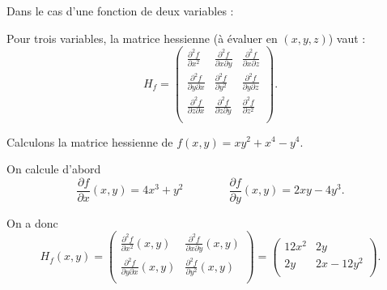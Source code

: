 Dans le cas d'une fonction de deux variables :

\bigskip

Pour trois variables, la matrice hessienne (à évaluer en $(x,y,z)$) vaut :
$$H_f=
\begin{pmatrix}
\frac{\partial^2f}{\partial x^2}&\frac{\partial^2f}{\partial x\partial y}&\frac{\partial^2f}{\partial x\partial z}\\  \frac{\partial^2f}{\partial y\partial x}&\frac{\partial^2f}{\partial y^2}&\frac{\partial^2f}{\partial y\partial z}\\  \frac{\partial^2f}{\partial z\partial x}&\frac{\partial^2f}{\partial z\partial y}&\frac{\partial^2f}{\partial z^2}\\
\end{pmatrix}.$$

\begin{exemple}{}{}
Calculons la matrice hessienne de $f(x,y) = xy^2 + x^4 - y^4$.

On calcule d'abord 
$$\frac{\partial f}{\partial x}(x,y) = 4x^3 + y^2
\qquad\qquad
\frac{\partial f}{\partial y}(x,y) = 2xy - 4y^3.$$

On a donc 
$$H_f(x,y)
= \begin{pmatrix}
    \frac{\partial ^2f}{\partial x^2}(x,y) & \frac{\partial ^2f}{\partial x\partial y}(x,y) \\
    \frac{\partial ^2f}{\partial y\partial x}(x,y) & \frac{\partial ^2f}{\partial y^2}(x,y) \\
\end{pmatrix}
= 
\begin{pmatrix}
12x^2 & 2y \\
2y      & 2x - 12y^2 \\
\end{pmatrix}.$$
\end{exemple}



